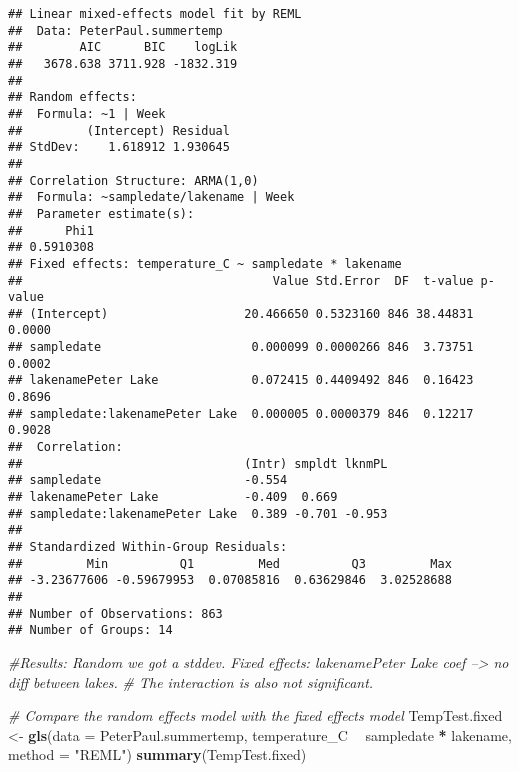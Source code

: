 \documentclass[]{article}
\newenvironment{Shaded}{\begin{snugshade}}{\end{snugshade}}
\newcommand{\KeywordTok}[1]{\textcolor[rgb]{0.13,0.29,0.53}{\textbf{#1}}}
\newcommand{\DataTypeTok}[1]{\textcolor[rgb]{0.13,0.29,0.53}{#1}}
\newcommand{\StringTok}[1]{\textcolor[rgb]{0.31,0.60,0.02}{#1}}
\newcommand{\CommentTok}[1]{\textcolor[rgb]{0.56,0.35,0.01}{\textit{#1}}}
\newcommand{\OperatorTok}[1]{\textcolor[rgb]{0.81,0.36,0.00}{\textbf{#1}}}
\newcommand{\NormalTok}[1]{#1}
\begin{document}
\begin{verbatim}
## Linear mixed-effects model fit by REML
##  Data: PeterPaul.summertemp 
##        AIC      BIC    logLik
##   3678.638 3711.928 -1832.319
## 
## Random effects:
##  Formula: ~1 | Week
##         (Intercept) Residual
## StdDev:    1.618912 1.930645
## 
## Correlation Structure: ARMA(1,0)
##  Formula: ~sampledate/lakename | Week 
##  Parameter estimate(s):
##      Phi1 
## 0.5910308 
## Fixed effects: temperature_C ~ sampledate * lakename 
##                                   Value Std.Error  DF  t-value p-value
## (Intercept)                   20.466650 0.5323160 846 38.44831  0.0000
## sampledate                     0.000099 0.0000266 846  3.73751  0.0002
## lakenamePeter Lake             0.072415 0.4409492 846  0.16423  0.8696
## sampledate:lakenamePeter Lake  0.000005 0.0000379 846  0.12217  0.9028
##  Correlation: 
##                               (Intr) smpldt lknmPL
## sampledate                    -0.554              
## lakenamePeter Lake            -0.409  0.669       
## sampledate:lakenamePeter Lake  0.389 -0.701 -0.953
## 
## Standardized Within-Group Residuals:
##         Min          Q1         Med          Q3         Max 
## -3.23677606 -0.59679953  0.07085816  0.63629846  3.02528688 
## 
## Number of Observations: 863
## Number of Groups: 14
\end{verbatim}

\begin{Shaded}
\begin{Highlighting}[]
\CommentTok{#Results: Random we got a stddev. Fixed effects: lakenamePeter Lake coef --> no diff between lakes. }
\CommentTok{# The interaction is also not significant.}

\CommentTok{# Compare the random effects model with the fixed effects model}
\NormalTok{TempTest.fixed <-}\StringTok{ }\KeywordTok{gls}\NormalTok{(}\DataTypeTok{data =}\NormalTok{ PeterPaul.summertemp,}
\NormalTok{                      temperature_C }\OperatorTok{~}\StringTok{ }\NormalTok{sampledate }\OperatorTok{*}\StringTok{ }\NormalTok{lakename, }
                      \DataTypeTok{method =} \StringTok{"REML"}\NormalTok{)}
\KeywordTok{summary}\NormalTok{(TempTest.fixed)}
\end{Highlighting}
\end{Shaded}
\end{document}
